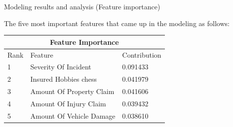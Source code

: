\documentclass[aspectratio=169,xcolor=dvipsnames]{beamer}
\begin{document}
\begin{frame}{Modeling results and analysis (Feature importance)}

The five most important features that came up in the modeling as follows:


\vspace{0.2in}
\begin{center}
\begin{tabular}{ |p{3cm}|p{8cm}|p{2.5cm}|  }
 \hline
 \multicolumn{3}{|c|}{Feature Importance} \\
 \hline
Rank& Feature & Contribution\\
 \hline
1 & Severity Of Incident   &       0.091433\\
2 & Insured Hobbies chess  &      0.041979\\
3 & Amount Of Property Claim  &     0.041606\\
4 & Amount Of Injury Claim   &      0.039432\\
5 & Amount Of Vehicle Damage  &     0.038610\\
 \hline
\end{tabular}

\end{center}

\end{frame}
\end{document}

